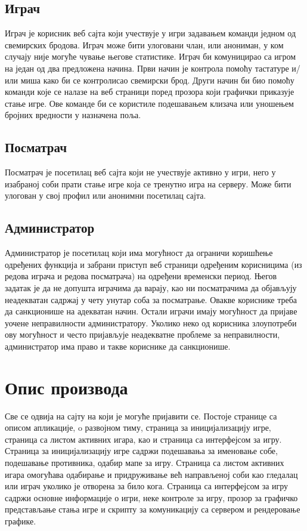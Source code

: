 \subsection{Играч}
Играч је корисник веб сајта који учествује у игри задавањем команди једном од свемирских бродова. Играч може бити улоговани члан, или анониман, у ком случају није могуће чување његове статистике. Играч би комуницирао са игром на један од два предложена начина. Први начин је контрола помоћу тастатуре и/или миша како би се контролисао свемирски брод. Други начин би био помоћу команди које се налазе на веб страници поред прозора који графички приказује стање игре. Ове команде би се користиле подешавањем клизача или уношењем бројних вредности у назначена поља.


\subsection{Посматрач}
Посматрач је посетилац веб сајта који не учествује активно у игри, него у изабраној соби прати стање игре која се тренутно игра на серверу. Може бити улогован у свој профил или анонимни посетилац сајта.

\subsection{Администратор}
Администратор је посетилац који има могућност да ограничи коришћење одређених функција и забрани приступ  веб страници одређеним корисницима (из редова играча и редова посматрача) на одређени временски период. Његов задатак је да не допушта играчима да варају, као ни посматрачима да објављују неадекватан садржај у чету унутар соба за посматрање. Овакве кориснике треба да санкционише на адекватан начин. Остали играчи имају могућност да пријаве уочене неправилности администратору. Уколико неко од корисника злоупотреби ову могућност и често пријављује неадекватне проблеме за неправилности, администратор има право и такве кориснике да санкционише.

\section{Опис производа}
Све се одвија на сајту на који је могуће пријавити се. Постоје странице са описом апликације, o развојном тиму, страница за иницијализацију игре, страница са листом активних игара, као и страница са интерфејсом за игру.
Страница за иницијализацију игре садржи подешавања за именовање собе, подешавање противника, одабир мапе за игру.
Страница са листом активних игара омогућава одабирање и придруживање већ направљеној соби као гледалац или играч уколико је отворена за било кога.
Страница са интерфејсом за игру садржи основне информације о игри, неке контроле за игру, прозор за графичко представљање стања игре и скрипту за комуникацију са сервером и рендеровање графике.

